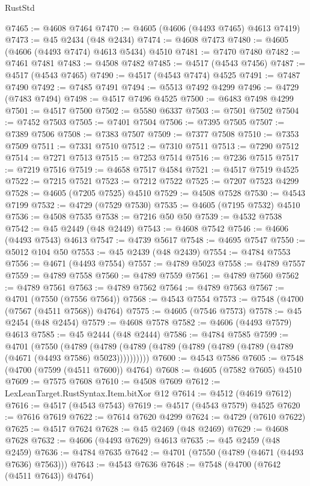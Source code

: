 \begin{lexlean}{RustStd}
\begin{coremodule}
@7465 := @4608 @7464
@7470 := @4605 (@4606 (@4493 @7465) @4613 @7419)
@7473 := @45 @2434 (@48 @2434)
@7474 := @4608 @7473
@7480 := @4605 (@4606 (@4493 @7474) @4613 @5434) @4510
@7481 := @7470 @7480
@7482 := @7461 @7481
@7483 := @4508 @7482
@7485 := @4517 (@4543 @7456)
@7487 := @4517 (@4543 @7465)
@7490 := @4517 (@4543 @7474) @4525
@7491 := @7487 @7490
@7492 := @7485 @7491
@7494 := @5513 @7492 @4299
@7496 := @4729 (@7483 @7494)
@7498 := @4517 @7496 @4525
@7500 := @6483 @7498 @4299
@7501 := @4517 @7500
@7502 := @5580 @6337
@7503 := @7501 @7502
@7504 := @7452 @7503
@7505 := @7401 @7504
@7506 := @7395 @7505
@7507 := @7389 @7506
@7508 := @7383 @7507
@7509 := @7377 @7508
@7510 := @7353 @7509
@7511 := @7331 @7510
@7512 := @7310 @7511
@7513 := @7290 @7512
@7514 := @7271 @7513
@7515 := @7253 @7514
@7516 := @7236 @7515
@7517 := @7219 @7516
@7519 := @4658 @7517 @4584
@7521 := @4517 @7519 @4525
@7522 := @7215 @7521
@7523 := @7212 @7522
@7525 := @7207 @7523 @4299
@7528 := @4605 (@7205 @7525) @4510
@7529 := @4508 @7528
@7530 := @4543 @7199
@7532 := @4729 (@7529 @7530)
@7535 := @4605 (@7195 @7532) @4510
@7536 := @4508 @7535
@7538 := @7216 @50 @50
@7539 := @4532 @7538
@7542 := @45 @2449 (@48 @2449)
@7543 := @4608 @7542
@7546 := @4606 (@4493 @7543) @4613
@7547 := @4739 @5617
@7548 := @4695 @7547
@7550 := @5012 @104 @50
@7553 := @45 @2439 (@48 @2439)
@7554 := @4784 @7553
@7556 := @4671 (@4493 @7554)
@7557 := @4789 @5023
@7558 := @4789 @7557
@7559 := @4789 @7558
@7560 := @4789 @7559
@7561 := @4789 @7560
@7562 := @4789 @7561
@7563 := @4789 @7562
@7564 := @4789 @7563
@7567 := @4701 (@7550 (@7556 @7564))
@7568 := @4543 @7554
@7573 := @7548 (@4700 (@7567 (@4511 @7568)) @4764)
@7575 := @4605 (@7546 @7573)
@7578 := @45 @2454 (@48 @2454)
@7579 := @4608 @7578
@7582 := @4606 (@4493 @7579) @4613
@7585 := @45 @2444 (@48 @2444)
@7586 := @4784 @7585
@7599 := @4701
    (@7550
      (@4789 (@4789 (@4789 (@4789 (@4789 (@4789 (@4789 (@4789 (@4671 (@4493 @7586) @5023))))))))))
@7600 := @4543 @7586
@7605 := @7548 (@4700 (@7599 (@4511 @7600)) @4764)
@7608 := @4605 (@7582 @7605) @4510
@7609 := @7575 @7608
@7610 := @4508 @7609
@7612 := LexLeanTarget.RustSyntax.Item.bitXor @12
@7614 := @4512 (@4619 @7612)
@7616 := @4517 (@4543 @7543)
@7619 := @4517 (@4543 @7579) @4525
@7620 := @7616 @7619
@7622 := @7614 @7620 @4299
@7624 := @4729 (@7610 @7622)
@7625 := @4517 @7624
@7628 := @45 @2469 (@48 @2469)
@7629 := @4608 @7628
@7632 := @4606 (@4493 @7629) @4613
@7635 := @45 @2459 (@48 @2459)
@7636 := @4784 @7635
@7642 := @4701 (@7550 (@4789 (@4671 (@4493 @7636) @7563)))
@7643 := @4543 @7636
@7648 := @7548 (@4700 (@7642 (@4511 @7643)) @4764)

\end{coremodule}
\end{lexlean}

